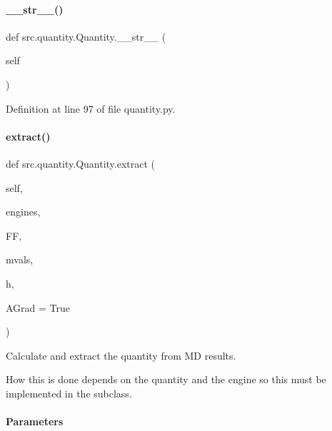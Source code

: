 \paragraph{\texorpdfstring{\+\_\+\+\_\+str\+\_\+\+\_\+()}{\_\_str\_\_()}}
{\footnotesize\ttfamily def src.\+quantity.\+Quantity.\+\_\+\+\_\+str\+\_\+\+\_\+ (\begin{DoxyParamCaption}\item[{}]{self }\end{DoxyParamCaption})\hspace{0.3cm}{\ttfamily [inherited]}}



Definition at line 97 of file quantity.\+py.

\mbox{\label{classsrc_1_1quantity_1_1Quantity_a31f14fa77a8312030e07f3be4b797dec}} 
\paragraph{\texorpdfstring{extract()}{extract()}\hspace{0.1cm}{\footnotesize\ttfamily [1/2]}}
{\footnotesize\ttfamily def src.\+quantity.\+Quantity.\+extract (\begin{DoxyParamCaption}\item[{}]{self,  }\item[{}]{engines,  }\item[{}]{FF,  }\item[{}]{mvals,  }\item[{}]{h,  }\item[{}]{A\+Grad = {\ttfamily True} }\end{DoxyParamCaption})\hspace{0.3cm}{\ttfamily [inherited]}}



Calculate and extract the quantity from MD results. 

How this is done depends on the quantity and the engine so this must be implemented in the subclass.

\paragraph*{Parameters }

